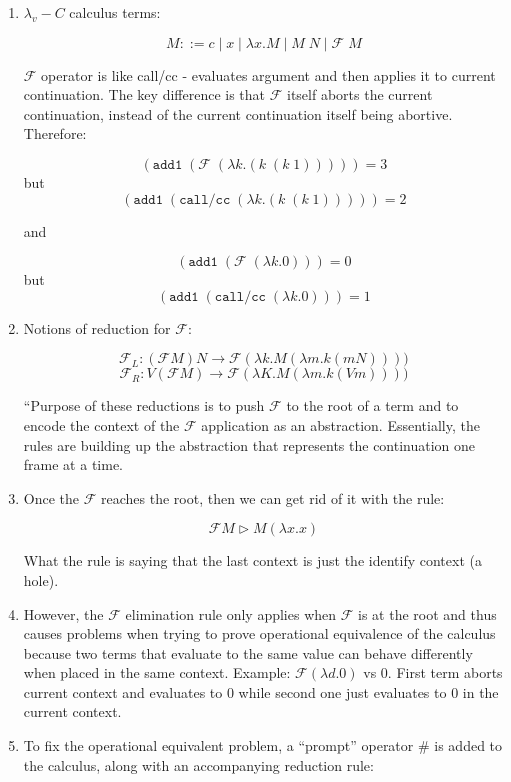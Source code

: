 \documentclass[letterpaper]{llncs}
\newcommand{\F}{ \ensuremath{ \mathcal{F} } }
\newcommand{\app}[2]{ \ensuremath{ #1 \; #2 } }
\newcommand{\appp}[2]{ \ensuremath{ (\app{#1}{#2}) } }
\newcommand{\lam}[2]{ \ensuremath{ \lambda #1.#2 } }
\newcommand{\lamp}[2]{ \ensuremath{ (\lam{#1}{#2}) } }
\newcommand{\createop}[1]{\texttt{#1}\xspace}
\newcommand{\callcc}{\createop{call/cc}}
\newcommand{\addone}{\createop{add1}}
\begin{document}
\begin{enumerate}

	\item $\lambda_v\!\!-\!\!C$ calculus terms:
	
$$M ::= c \mid x \mid \lam{x}{M} \mid \app{M}{N} \mid \app{\F}{M}$$

$\F$ operator is like call/cc - evaluates argument and then applies it to current continuation. The key difference is that $\F$ itself aborts the current continuation, instead of the current continuation itself being abortive. Therefore: 

$$\appp{ \addone }{ \appp{ \F }{ \lamp{k}{ \appp{ k }{ \appp{k}{1} } }}} = 3$$
 but 
$$\appp{ \addone }{ \appp{ \callcc }{ \lamp{k}{ \appp{ k }{ \appp{k}{1} } }}} = 2$$
	
and 

$$\appp{ \addone }{ \appp{ \F }{ \lamp{k}{ 0 }}} = 0$$
 but 
$$\appp{ \addone }{ \appp{ \callcc }{ \lamp{k}{ 0 }}} = 1$$

	\item Notions of reduction for $\F$:
	
	$$\F_L: (\F M) N \rightarrow \F (\lambda k.M (\lambda m.k (m N))))$$
	$$\F_R: V (\F M) \rightarrow \F (\lambda K.M (\lambda m.k (V m))))$$

``Purpose of these reductions is to push $\F$ to the root of a term and to encode the context of the $\F$ application as an abstraction. Essentially, the rules are building up the abstraction that represents the continuation one frame at a time.

	\item

Once the $\F$ reaches the root, then we can get rid of it with the rule:

$$\F M \triangleright M (\lambda x.x)$$

What the rule is saying that the last context is just the identify context (a hole).

	\item However, the $\F$ elimination rule only applies when $\F$ is at the root and thus causes problems when trying to prove operational equivalence of the calculus because two terms that evaluate to the same value can behave differently when placed in the same context. Example: $\F (\lambda d.0)$ vs 0. First term aborts current context and evaluates to 0 while second one just evaluates to 0 in the current context.
	
	\item To fix the operational equivalent problem, a ``prompt'' operator \# is added to the calculus, along with an accompanying reduction rule:
	

\end{enumerate}
\end{document}
